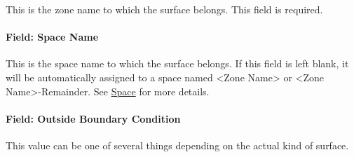 This is the zone name to which the surface belongs. This field is required.

\paragraph{Field: Space Name}\label{field-space-name-11-000}

This is the space name to which the surface belongs. If this field is left blank, it will be automatically assigned to a space named <Zone Name> or <Zone Name>-Remainder. See \hyperref[space]{Space} for more details.

\paragraph{Field: Outside Boundary Condition}\label{field-outside-boundary-condition-1}

This value can be one of several things depending on the actual kind of surface.

